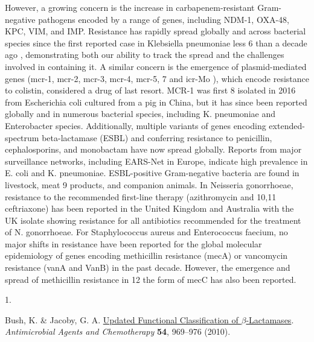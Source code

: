 \documentclass[
]{book}
\newlength{\cslhangindent}
\newlength{\csllabelwidth}
\newlength{\cslentryspacingunit} %
\newenvironment{CSLReferences}[2] %
 {%
  \setlength{\parindent}{0pt}
  \ifodd #1
  \let\oldpar\par
  \def\par{\hangindent=\cslhangindent\oldpar}
  \fi
  \setlength{\parskip}{#2\cslentryspacingunit}
 }%
 {}
\newcommand{\CSLLeftMargin}[1]{\parbox[t]{\csllabelwidth}{#1}}
\newcommand{\CSLRightInline}[1]{\parbox[t]{\linewidth - \csllabelwidth}{#1}\break}
\begin{document}
However, a growing concern is the increase in carbapenem-resistant Gram-negative pathogens encoded by a range of genes, including NDM-1, OXA-48, KPC, VIM, and IMP. Resistance has rapidly spread globally and across bacterial species since the first reported case in Klebsiella pneumoniae less 6 than a decade ago , demonstrating both our ability to track the spread and the challenges involved in containing it. A similar concern is the emergence of plasmid-mediated genes (mcr-1, mcr-2, mcr-3, mcr-4, mcr-5, 7 and icr-Mo ), which encode resistance to colistin, considered a drug of last resort. MCR-1 was first 8 isolated in 2016 from Escherichia coli cultured from a pig in China, but it has since been reported globally and in numerous bacterial species, including K. pneumoniae and Enterobacter species. Additionally, multiple variants of genes encoding extended-spectrum beta-lactamase (ESBL) and conferring resistance to penicillin, cephalosporins, and monobactam have now spread globally. Reports from major surveillance networks, including EARS-Net in Europe, indicate high prevalence in E. coli and K. pneumoniae. ESBL-positive Gram-negative bacteria are found in livestock, meat 9 products, and companion animals. In Neisseria gonorrhoeae, resistance to the recommended first-line therapy (azithromycin and 10,11 ceftriaxone) has been reported in the United Kingdom and Australia with the UK isolate showing resistance for all antibiotics recommended for the treatment of N. gonorrhoeae. For Staphylococcus aureus and Enterococcus faecium, no major shifts in resistance have been reported for the global molecular epidemiology of genes encoding methicillin resistance (mecA) or vancomycin resistance (vanA and VanB) in the past decade. However, the emergence and spread of methicillin resistance in 12 the form of mecC has also been reported.

\hypertarget{refs}{}
\begin{CSLReferences}{0}{0}
\leavevmode{}%
\CSLLeftMargin{1. }
\CSLRightInline{Bush, K. \& Jacoby, G. A. \href{https://doi.org/10.1128/AAC.01009-09}{Updated {Functional Classification} of {\(\beta\)}-{Lactamases}}. \emph{Antimicrobial Agents and Chemotherapy} \textbf{54}, 969--976 (2010).}

\end{CSLReferences}
\end{document}
